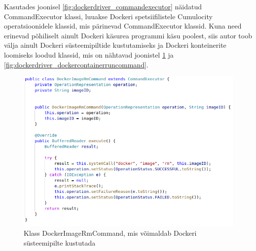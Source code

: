 \documentclass[12pt]{article}
\begin{document}
 
 
  
 
  
  
 
  Kasutades joonisel \ref{fig:dockerdriver_commandexecutor} näidatud CommandExecutor klassi,
  luuakse Dockeri spetsiifilistele Cumulocity operatsioonidele klassid, mis pärinevad
  CommandExecutor klassid. Kuna need erinevad põhiliselt ainult Dockeri käsurea programmi
  käsu poolest, siis autor toob välja ainult Dockeri süsteemipiltide kustutamiseks ja Dockeri
  konteinerite loomiseks loodud klassid, mis on nähtavad
  joonistel \ref{fig:dockerdriver_dockerimagermcommand} ja \ref{fig:dockerdriver_dockercontainerruncommand}.
 
 
  \begin{figure} [ht] %
  \begin{center}
  \includegraphics[width=1.0\textwidth]{dockerdriver_dockerimagermcommand}
  \caption{Klass DockerImageRmCommand, mis võimaldab Dockeri süsteemipilte kustutada}
  \label{fig:dockerdriver_dockerimagermcommand}
  \end{center}
  \end{figure}
  
\end{document}
